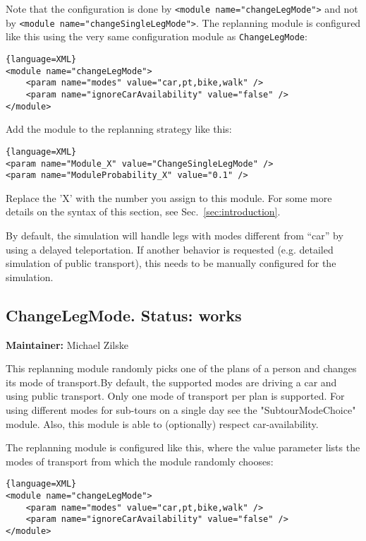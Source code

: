 Note that the configuration is done by \verb$<module name="changeLegMode">$ and not by \verb$<module name="changeSingleLegMode">$. The replanning module is configured like  this using the very same configuration module as \verb$ChangeLegMode$:
\begin{lstlisting}{language=XML}
<module name="changeLegMode">
    <param name="modes" value="car,pt,bike,walk" />
    <param name="ignoreCarAvailability" value="false" />
</module>
\end{lstlisting}

Add the module to the replanning strategy like this:
\begin{lstlisting}{language=XML}
<param name="Module_X" value="ChangeSingleLegMode" />
<param name="ModuleProbability_X" value="0.1" />
\end{lstlisting}

Replace the 'X' with the number you assign to this module. For some more details on the syntax of this section, see Sec.~\ref{sec:introduction}.

By default, the simulation will handle legs with modes different from  ``car'' by using a delayed teleportation. If another behavior is  requested (e.g. detailed simulation of public transport), this needs to  be manually configured for the simulation.


\subsection{ChangeLegMode. Status: works}
\label{sec:changeLegMode}

\textbf{Maintainer:} Michael Zilske

This replanning module randomly picks one of the plans of a person  and changes its mode of transport.By default, the supported modes  are driving a car and using public transport. Only one mode of transport  per plan is supported. For using different modes for sub-tours on a  single day see the "SubtourModeChoice" module. Also, this module is able  to (optionally) respect car-availability.

The replanning module is configured like this, where the value  parameter lists the modes of transport from which the module randomly  chooses:
\begin{lstlisting}{language=XML}
<module name="changeLegMode">
    <param name="modes" value="car,pt,bike,walk" />
    <param name="ignoreCarAvailability" value="false" />
</module>
\end{lstlisting}

